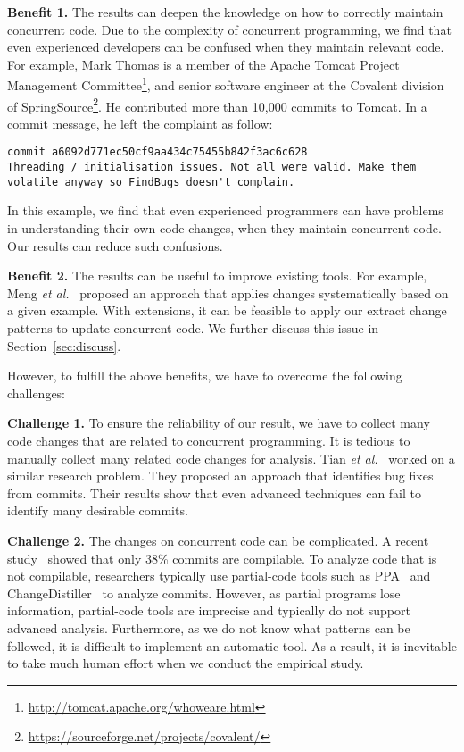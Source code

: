 \noindent
\textbf{Benefit 1.} The results can deepen the knowledge on how to correctly maintain concurrent code. Due to the complexity of concurrent programming, we find that even experienced developers can be confused when they maintain relevant code. For example, Mark Thomas is a member of the Apache Tomcat Project Management Committee\footnote{\url{http://tomcat.apache.org/whoweare.html}}, and senior software engineer at the Covalent division of SpringSource\footnote{\url{https://sourceforge.net/projects/covalent/}}. He contributed more than 10,000 commits to Tomcat. In a commit message, he left the complaint as follow:


\begin{lstlisting}
commit a6092d771ec50cf9aa434c75455b842f3ac6c628
Threading / initialisation issues. Not all were valid. Make them volatile anyway so FindBugs doesn't complain.
\end{lstlisting}

\noindent
In this example, we find that even experienced programmers can have problems in understanding their own code changes, when they maintain concurrent code. Our results can reduce such confusions.


\noindent
\textbf{Benefit 2.} The results can be useful to improve existing tools. For example, Meng \emph{et al.}~\cite{conf/pldi/MengKM11} proposed an approach that applies changes systematically based on a given example. With extensions, it can be feasible to apply our extract change patterns to update concurrent code. We further discuss this issue in Section~\ref{sec:discuss}.

However, to fulfill the above benefits, we have to overcome the following challenges:

\noindent
\textbf{Challenge 1.} To ensure the reliability of our result, we have to collect many code changes that are related to concurrent programming. It is tedious to manually collect many related code changes for analysis. Tian \emph{et al.}~\cite{tian2012identifying} worked on a similar research problem. They proposed an approach that identifies bug fixes from commits. Their results show that even advanced techniques can fail to identify many desirable commits.


\noindent
\textbf{Challenge 2.} The changes on concurrent code can be complicated. A recent study~\cite{tufano2016there} showed that only 38\% commits are compilable. To analyze code that is not compilable, researchers typically use partial-code tools such as PPA~\cite{DagenaisH08ppa} and ChangeDistiller~\cite{fluri2007change} to analyze commits. However, as partial programs lose information, partial-code tools are imprecise and typically do not support advanced analysis. Furthermore, as we do not know what patterns can be followed, it is difficult to implement an automatic tool. As a result, it is inevitable to take much human effort when we conduct the empirical study.

